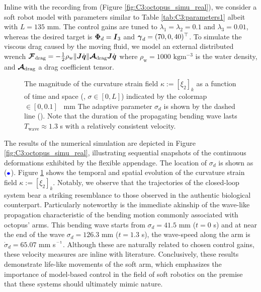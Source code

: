 Inline with the recording from \cite{Sumbre2001Sep} (Figure \ref{fig:C3:octopus_simu_real}), we consider a soft robot model with parameters similar to Table \ref{tab:C3:parameters1} albeit with $L = 135$ \si{\milli \meter}. The control gains are tuned to $\lambda_1 = \lambda_2 = 0.1$ and $\lambda_3 = 0.01$, whereas the desired target is ${\boldsymbol{\Phi}}_d = {\boldsymbol{I}}_3$ and ${\boldsymbol{\gamma}}_d = (70, 0, 40)^\top$. To simulate the viscous drag caused by the moving fluid, we model an external distributed wrench $\boldsymbol{\mathcal{F}}_{\textrm{drag}} = -\frac{1}{2}\rho_{\textrm{w}} \lVert{\boldsymbol{J}} {\dot{\boldsymbol{q}}}\rVert \boldsymbol{\mathcal{A}}_{\textrm{drag}} {\boldsymbol{J}} {\dot{\boldsymbol{q}}} $ where $\rho_{\textrm{w}} = 1000$ $\text{kg}\text{m}^{-3}$ is the water density, and $\boldsymbol{\mathcal{A}}_{\textrm{drag}}$ a drag coefficient tensor. %
\vspace{1mm}
\begin{figure}[!t]
  \centering
  \vspace{-2mm}
  
  \vspace{-7mm}
  \caption{\small The magnitude of the curvature strain field $\kappa:=[\xi_2]_k$ as a function of time and space (\ie, $\sigma \in [0,L]$) indicated by the colormap \protect{}$\!\!\in [0,0.1]$ \si{\per \milli \meter } The adaptive parameter $\sigma_d$ is shown by the dashed line (). Note that the duration of the propagating bending wave lasts $T_{\textrm{wave}} \approx 1.3$ s with a relatively consistent velocity. }\label{fig:C3:bend_propogate}
  \vspace{-4mm}
\end{figure}
The results of the numerical simulation are depicted in Figure \ref{fig:C3:octopus_simu_real}, illustrating sequential snapshots of the continuous deformations exhibited by the flexible appendage. The location of $\sigma_d$ is shown as ($\textcolor{blue}{\bullet}$). Figure \ref{fig:C3:bend_propogate} shows the temporal and spatial evolution of the curvature strain field $\kappa:=[\xi_2]_k$. Notably, we observe that the trajectories of the closed-loop system bear a striking resemblance to those observed in the authentic biological counterpart. Particularly noteworthy is the immediate akinship of the wave-like propagation characteristic of the bending motion commonly associated with octopus' arms. This bending wave starts from $\sigma_d = 41.5$ mm ($t=0$ s) and at near the end of the wave $\sigma_d = 126.3$ mm ($t=1.3$ s), the wave-speed along the arm is $\dot{\sigma}_d = 65.07$ mm s$\inv$. Although these are naturally related to chosen control gains, these velocity measures are inline with literature. Conclusively, these results demonstrate life-like movements of the soft arm, which emphasizes the importance of model-based control in the field of soft robotics on the premise that these systems should ultimately mimic nature.

